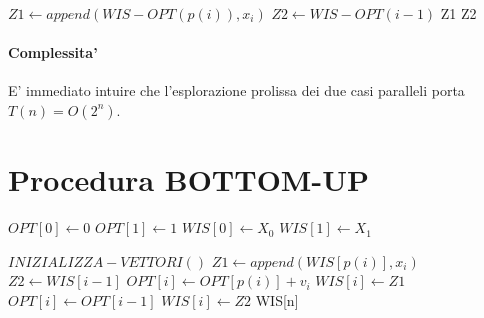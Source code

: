 \begin{algorithm}
    \begin{algorithmic}
                \State {}
                \State {}
            \Else
                \State $Z1 \gets append(WIS-OPT(p(i)), x_i)$
                \State $Z2 \gets WIS-OPT(i - 1)$
                    \State \Return Z1
                \Else
                    \State \Return Z2
                \EndIf
            \EndIf
       \EndProcedure
    \end{algorithmic}
\end{algorithm}

\paragraph{Complessita'}
E' immediato intuire che l'esplorazione prolissa dei due casi paralleli porta $T(n) = O(2^n)$.

\section{Procedura BOTTOM-UP}

\begin{algorithm}
    \begin{algorithmic}
            \State $OPT[0] \gets 0$
            \State $OPT[1] \gets 1$
            \State $WIS[0] \gets X_0$
            \State $WIS[1] \gets X_1$
        \EndProcedure
    \end{algorithmic}
\end{algorithm}

\begin{algorithm}
    \begin{algorithmic}
            \State $INIZIALIZZA-VETTORI()$
                \State $Z1 \gets append(WIS[p(i)], x_i)$
                \State $Z2 \gets WIS[i-1]$
                    \State $OPT[i] \gets OPT[p(i)] + v_i$
                    \State $WIS[i] \gets Z1$
                \Else
                    \State $OPT[i] \gets OPT[i-1]$
                    \State $WIS[i] \gets Z2$
                \EndIf
            \EndFor
            \State \Return WIS[n]
        \EndProcedure
    \end{algorithmic}
\end{algorithm}

